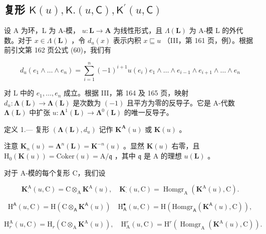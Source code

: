 \subsection{\texorpdfstring{复形 \(\mathsf{K}(u),\mathsf{K}.(u,\mathsf{C}),\mathsf{K}^{\prime}(u,\mathsf{C})\)}{复形 \textbackslash mathsf\{K\}(u),\textbackslash mathsf\{K\}.(u,\textbackslash mathsf\{C\}),\textbackslash mathsf\{K\}\^{}\{\textbackslash prime\}(u,\textbackslash mathsf\{C\})}}

设 A 为环，L 为 A-模， \(u: \mathbf{L} \to \mathbf{A}\) 为线性形式，且 \(\Lambda(\mathbf{L})\) 为 A-模 L 的外代数。对于 \(x \in \Lambda(\mathbf{L})\) ，令 \(d_u(x)\) 表示内积 \(x \sqsubseteq u\) （III，第 161 页，例）。根据前引文第 162 页公式 (60)，我们有

\[
d _ {u} \left(e _ {1} \wedge \dots \wedge e _ {n}\right) = \sum_ {i = 1} ^ {n} (- 1) ^ {i + 1} u \left(e _ {i}\right) e _ {1} \wedge \dots \wedge e _ {i - 1} \wedge e _ {i + 1} \wedge \dots \wedge e _ {n}\tag{1}
\]

对 L 中的 \(e_1, \ldots, e_n\) 成立。根据 III，第 164 及 165 页，映射 \(d_u: \symbf{\Lambda}(\mathbf{L}) \to \symbf{\Lambda}(\mathbf{L})\) 是次数为 \((-1)\) 且平方为零的反导子。它是 A-代数 \(\symbf{\Lambda}(\mathbf{L})\) 中扩张 \(u: \symbf{\Lambda}^1(\mathbf{L}) \to \symbf{\Lambda}^0(\mathbf{L})\) 的唯一反导子。

定义 1.--- 复形 \((\symbf{\Lambda}(\mathbf{L}), d_u)\) 记作 \(\mathbf{K}^{\mathbf{A}}(u)\) 或 \(\mathbf{K}(u)\) 。

注意 \(\mathbf{K}_{n}(u)=\symbf{\Lambda}^{n}(\mathbf{L})=\mathbf{K}^{-n}(u)\) 。显然 \(\mathbf{K}(u)\) 右零，且 \(\mathrm{H}_{0}(\mathbf{K}(u))=\mathrm{Coker}(u)=\mathrm{A}/\mathfrak{q}\) ，其中 \(\mathfrak{q}\) 是 A 的理想 \(u(\mathbf{L})\) 。

对于 A-模的每个复形 C，我们设

\[
\mathbf {K} _ {\cdot} ^ {\mathrm{A}} (u, \mathrm{C}) = \mathrm{C} \otimes_ {\mathrm{A}} \mathbf {K} ^ {\mathrm{A}} (u), \quad \mathbf {K} _ {\cdot} ^ {\cdot} (u, \mathrm{C}) = \operatorname{Homgr} _ {\mathrm{A}} (\mathbf {K} ^ {\mathrm{A}} (u), \mathrm{C}).
\]

\[
\mathrm{H} ^ {\mathsf {A}} (u, \mathrm{C}) = \mathrm{H} (\mathrm{C} \otimes_ {\mathsf {A}} \mathbf {K} ^ {\mathsf {A}} (u)) \quad \mathrm{H} _ {\mathsf {A}} ^ {\bullet} (u, \mathrm{C}) = \mathrm{H} (\mathrm{Homgr} _ {\mathsf {A}} (\mathbf {K} ^ {\mathsf {A}} (u), \mathrm{C})) ,
\]

\[
\mathrm{H} _ {r} ^ {\mathrm{A}} (u, \mathrm{C}) = \mathrm{H} _ {r} (\mathrm{C} \otimes_ {\mathrm{A}} \mathbf {K} ^ {\mathrm{A}} (u)), \quad \mathrm{H} _ {\mathrm{A}} ^ {r} (u, \mathrm{C}) = \mathrm{H} ^ {r} (\operatorname{Homgr} _ {\mathrm{A}} (\mathbf {K} ^ {\mathrm{A}} (u), \mathrm{C})) .
\]

